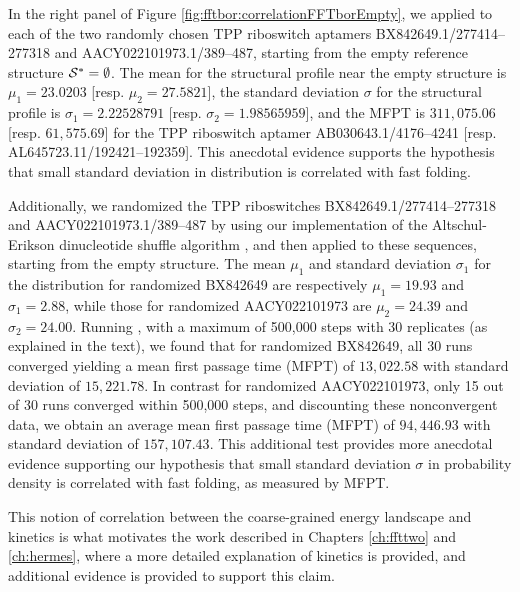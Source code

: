 In the right panel of Figure \ref{fig:fftbor:correlationFFTborEmpty}, we
applied \fftbor to each of the two randomly chosen TPP riboswitch
aptamers BX842649.1/277414--277318 and AACY022101973.1/389--487, starting
from the empty reference structure $\mathcal S^*=\emptyset$.
The mean for the \fftbor structural profile near the empty
structure is $\mu_1=23.0203$  [resp. $\mu_2=27.5821$], the
standard deviation $\sigma$ for the \fftbor structural profile
is $\sigma_1=2.22528791$  [resp. $\sigma_2=1.98565959$], and the \kinfold MFPT is
$311,075.06$ [resp. $61,575.69$] for the TPP riboswitch aptamer
AB030643.1/4176--4241 [resp.  AL645723.11/192421--192359]. This anecdotal evidence supports the hypothesis that small standard deviation in \fftbor distribution is correlated with fast folding.

Additionally, we randomized the TPP riboswitches BX842649.1/277414--277318 and AACY022101973.1/389--487 by using our implementation of the Altschul-Erikson dinucleotide shuffle algorithm
\citep{altschulErikson:dinucleotideShuffle}, and then applied \fftbor to these
sequences, starting from the empty structure.  The mean $\mu_1$ and standard
deviation $\sigma_1$ for the \fftbor distribution for randomized BX842649 are
respectively $\mu_1=19.93$ and $\sigma_1=2.88$, while those for randomized
AACY022101973 are $\mu_2=24.39$ and $\sigma_2=24.00$. Running \kinfold, with a
maximum of 500,000 steps with 30 replicates (as explained in the text), we
found
that for randomized BX842649, all 30 runs converged yielding a mean first passage
time (MFPT) of $13,022.58$ with standard deviation of $15,221.78$. In contrast for
randomized AACY022101973, only 15 out of 30 runs converged within 500,000 steps,
and discounting these nonconvergent data, we obtain an average mean first passage
time (MFPT) of $94,446.93$ with standard deviation of $157,107.43$. This additional
test provides more anecdotal evidence supporting our hypothesis that small
standard deviation $\sigma$ in \fftbor probability density is correlated with fast folding, as measured by MFPT.

This notion of correlation between the coarse-grained energy landscape and
kinetics is what motivates the work described in Chapters \ref{ch:ffttwo}
and \ref{ch:hermes}, where a more detailed explanation of kinetics is provided,
and additional evidence is provided to support this claim.


